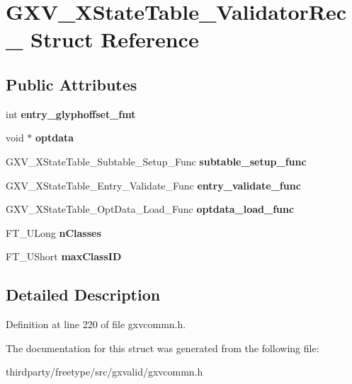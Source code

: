 \hypertarget{struct_g_x_v___x_state_table___validator_rec__}{}\section{G\+X\+V\+\_\+\+X\+State\+Table\+\_\+\+Validator\+Rec\+\_\+ Struct Reference}
\label{struct_g_x_v___x_state_table___validator_rec__}
\subsection*{Public Attributes}
\begin{DoxyCompactItemize}
\item 
\mbox{\label{struct_g_x_v___x_state_table___validator_rec___a570ee4abc64b4cabd741b9eb7547e933}} 
int {\bfseries entry\+\_\+glyphoffset\+\_\+fmt}
\item 
\mbox{\label{struct_g_x_v___x_state_table___validator_rec___ad6db975d9fd2b19800cfa9480dd06b1f}} 
void $\ast$ {\bfseries optdata}
\item 
\mbox{\label{struct_g_x_v___x_state_table___validator_rec___af7e77f7c958587819c315b5e6a83fed7}} 
G\+X\+V\+\_\+\+X\+State\+Table\+\_\+\+Subtable\+\_\+\+Setup\+\_\+\+Func {\bfseries subtable\+\_\+setup\+\_\+func}
\item 
\mbox{\label{struct_g_x_v___x_state_table___validator_rec___a6f79e1ba3f931ef3cd5dcd1fd8bf9e9c}} 
G\+X\+V\+\_\+\+X\+State\+Table\+\_\+\+Entry\+\_\+\+Validate\+\_\+\+Func {\bfseries entry\+\_\+validate\+\_\+func}
\item 
\mbox{\label{struct_g_x_v___x_state_table___validator_rec___a3ba537f78bdf6b491a4aac6f42f5e7e1}} 
G\+X\+V\+\_\+\+X\+State\+Table\+\_\+\+Opt\+Data\+\_\+\+Load\+\_\+\+Func {\bfseries optdata\+\_\+load\+\_\+func}
\item 
\mbox{\label{struct_g_x_v___x_state_table___validator_rec___a64d03b9f5e079c48632131a7b780404c}} 
F\+T\+\_\+\+U\+Long {\bfseries n\+Classes}
\item 
\mbox{\label{struct_g_x_v___x_state_table___validator_rec___a029df699295b0e2a0918b25579e03f4e}} 
F\+T\+\_\+\+U\+Short {\bfseries max\+Class\+ID}
\end{DoxyCompactItemize}


\subsection{Detailed Description}


Definition at line 220 of file gxvcommn.\+h.



The documentation for this struct was generated from the following file\+:\begin{DoxyCompactItemize}
\item 
thirdparty/freetype/src/gxvalid/gxvcommn.\+h\end{DoxyCompactItemize}
